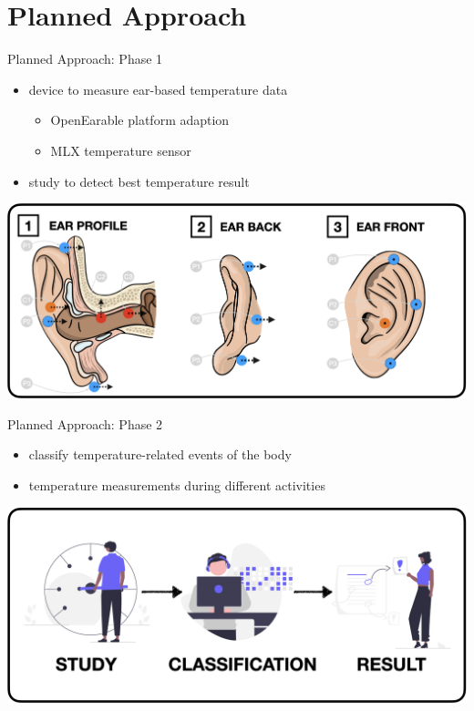 \documentclass[en]{sdqbeamer}
\begin{document}
\section{Planned Approach}
\begin{frame}{Planned Approach: Phase 1}
    \begin{itemize}
        \item device to measure ear-based temperature data
        \begin{itemize}
            \item OpenEarable platform adaption
            \item MLX temperature sensor
        \end{itemize}
        \item study to detect best temperature result
    \end{itemize}
    \begin{center}
        \includegraphics[scale=0.17]{../thesis-doc/images/ear_measurement_points/emp.png}    
    \end{center}
\end{frame}

\begin{frame}{Planned Approach: Phase 2}
    \begin{itemize}
        \item classify temperature-related events of the body
        \item temperature measurements during different activities
    \end{itemize}
    \begin{center}
        \includegraphics[scale=0.17]{proposal-presentation/images/analytics.png}    
    \end{center}
\end{frame}
\end{document}
